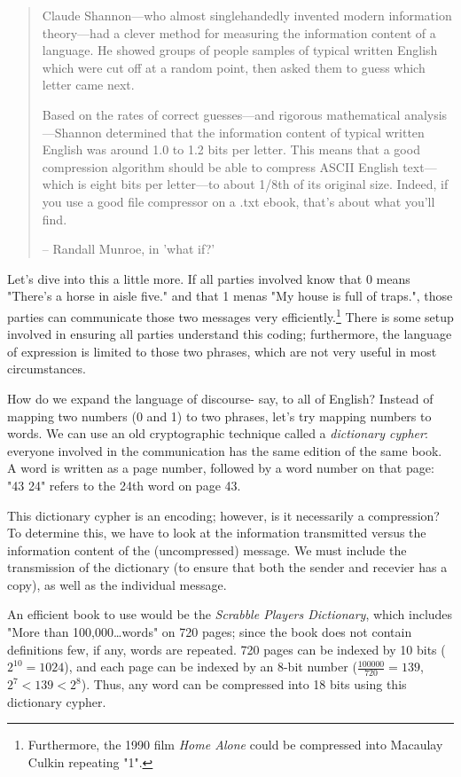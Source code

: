 \begin{quotation}
Claude Shannon—who almost singlehandedly invented modern information theory—had a clever method for measuring the information content of a language. He showed groups of people samples of typical written English which were cut off at a random point, then asked them to guess which letter came next.

Based on the rates of correct guesses—and rigorous mathematical analysis—Shannon determined that the information content of typical written English was around 1.0 to 1.2 bits per letter. This means that a good compression algorithm should be able to compress ASCII English text—which is eight bits per letter—to about 1/8th of its original size. Indeed, if you use a good file compressor on a .txt ebook, that’s about what you’ll find.

-- Randall Munroe, in 'what if?'\cite{xkcd-what-if-34}
\end{quotation}

Let's dive into this a little more. If all parties involved know that 0 means "There's a horse in aisle five." and that 1 menas "My house is full of traps.", those parties can communicate those two messages very efficiently.\footnote{Furthermore, the 1990 film \textit{Home Alone} could be compressed into Macaulay Culkin repeating "1".} There is some setup involved in ensuring all parties understand this coding; furthermore, the language of expression is limited to those two phrases, which are not very useful in most circumstances.

How do we expand the language of discourse- say, to all of English? Instead of mapping two numbers (0 and 1) to two phrases, let's try mapping numbers to words. We can use an old cryptographic technique called a \textit{dictionary cypher}: everyone involved in the communication has the same edition of the same book. A word is written as a page number, followed by a word number on that page: "43 24" refers to the 24th word on page 43.

This dictionary cypher is an encoding; however, is it necessarily a compression? To determine this, we have to look at the information transmitted versus the information content of the (uncompressed) message. We must include the transmission of the dictionary (to ensure that both the sender and recevier has a copy), as well as the individual message.

An efficient book to use would be the \textit{Scrabble Players Dictionary}, which includes "More than 100,000\ldots words" on 720 pages; since the book does not contain definitions few, if any, words are repeated. 
720 pages can be indexed by 10 bits ($2^{10}=1024$), and each page can be indexed by an 8-bit number ($\frac{100000}{720}=139$, $2^7 < 139 < 2^8$). Thus, any word can be compressed into 18 bits using this dictionary cypher.

